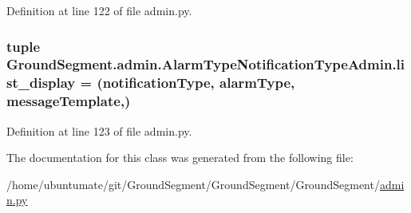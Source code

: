 Definition at line 122 of file admin.\+py.

\hypertarget{class_ground_segment_1_1admin_1_1_alarm_type_notification_type_admin_ac52ed410fef4e7f5105e37235b7453ee}{}
\subsubsection[{list\+\_\+display}]{\setlength{\rightskip}{0pt plus 5cm}tuple Ground\+Segment.\+admin.\+Alarm\+Type\+Notification\+Type\+Admin.\+list\+\_\+display = (\textquotesingle{}notification\+Type\textquotesingle{}, \textquotesingle{}alarm\+Type\textquotesingle{}, \textquotesingle{}message\+Template\textquotesingle{},)\hspace{0.3cm}{\ttfamily [static]}}\label{class_ground_segment_1_1admin_1_1_alarm_type_notification_type_admin_ac52ed410fef4e7f5105e37235b7453ee}


Definition at line 123 of file admin.\+py.



The documentation for this class was generated from the following file\+:\begin{DoxyCompactItemize}
\item 
/home/ubuntumate/git/\+Ground\+Segment/\+Ground\+Segment/\+Ground\+Segment/\hyperlink{admin_8py}{admin.\+py}\end{DoxyCompactItemize}
